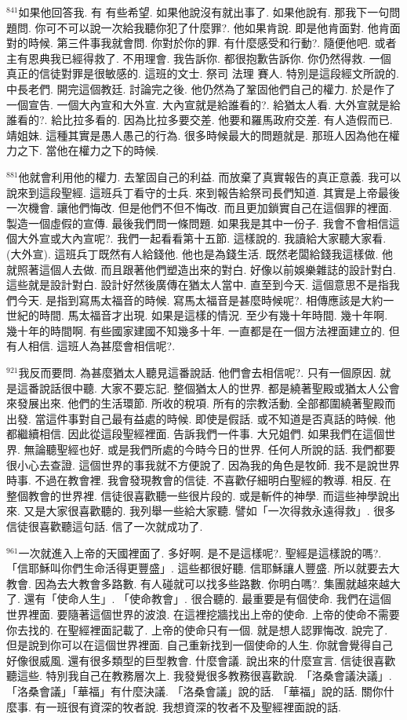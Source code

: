 \documentclass{book}
\begin{document}
$^{841}$如果他回答我.
有 有些希望.
如果他說沒有就出事了.
如果他說有.
那我下一句問題問.
你可不可以說一次給我聽你犯了什麼罪?.
他如果肯說.
即是他肯面對.
他肯面對的時候.
第三件事我就會問.
你對於你的罪.
有什麼感受和行動?.
隨便他吧.
或者主有恩典我已經得救了.
不用理會.
我告訴你.
都很抱歉告訴你.
你仍然得救.
一個真正的信徒對罪是很敏感的.
這班的文士.
祭司 法理 賽人.
特別是這段經文所說的.
中長老們.
開完這個教廷.
討論完之後.
他仍然為了鞏固他們自己的權力.
於是作了一個宣告.
一個大內宣和大外宣.
大內宣就是給誰看的?.
給猶太人看.
大外宣就是給誰看的?.
給比拉多看的.
因為比拉多要交差.
他要和羅馬政府交差.
有人造假而已.
靖姐妹.
這種其實是愚人愚己的行為.
很多時候最大的問題就是.
那班人因為他在權力之下.
當他在權力之下的時候.

$^{881}$他就會利用他的權力.
去鞏固自己的利益.
而放棄了真實報告的真正意義.
我可以說來到這段聖經.
這班兵丁看守的士兵.
來到報告給祭司長們知道.
其實是上帝最後一次機會.
讓他們悔改.
但是他們不但不悔改.
而且更加鎖實自己在這個罪的裡面.
製造一個虛假的宣傳.
最後我們問一條問題.
如果我是其中一份子.
我會不會相信這個大外宣或大內宣呢?.
我們一起看看第十五節.
這樣說的.
我讀給大家聽大家看.
(大外宣).
這班兵丁既然有人給錢他.
他也是為錢生活.
既然老闆給錢我這樣做.
他就照著這個人去做.
而且跟著他們塑造出來的對白.
好像以前娛樂雜誌的設計對白.
這些就是設計對白.
設計好然後廣傳在猶太人當中.
直至到今天.
這個意思不是指我們今天.
是指到寫馬太福音的時候.
寫馬太福音是甚麼時候呢?.
相傳應該是大約一世紀的時間.
馬太福音才出現.
如果是這樣的情況.
至少有幾十年時間.
幾十年啊.
幾十年的時間啊.
有些國家建國不知幾多十年.
一直都是在一個方法裡面建立的.
但有人相信.
這班人為甚麼會相信呢?.

$^{921}$我反而要問.
為甚麼猶太人聽見這番說話.
他們會去相信呢?.
只有一個原因.
就是這番說話很中聽.
大家不要忘記.
整個猶太人的世界.
都是繞著聖殿或猶太人公會來發展出來.
他們的生活環節.
所收的稅項.
所有的宗教活動.
全部都圍繞著聖殿而出發.
當這件事對自己最有益處的時候.
即使是假話.
或不知道是否真話的時候.
他都繼續相信.
因此從這段聖經裡面.
告訴我們一件事.
大兄姐們.
如果我們在這個世界.
無論聽聖經也好.
或是我們所處的今時今日的世界.
任何人所說的話.
我們都要很小心去查證.
這個世界的事我就不方便說了.
因為我的角色是牧師.
我不是說世界時事.
不過在教會裡.
我會發現教會的信徒.
不喜歡仔細明白聖經的教導.
相反.
在整個教會的世界裡.
信徒很喜歡聽一些很片段的.
或是斬件的神學.
而這些神學說出來.
又是大家很喜歡聽的.
我列舉一些給大家聽.
譬如「一次得救永遠得救」.
很多信徒很喜歡聽這句話.
信了一次就成功了.

$^{961}$一次就進入上帝的天國裡面了.
多好啊.
是不是這樣呢?.
聖經是這樣說的嗎?.
「信耶穌叫你們生命活得更豐盛」.
這些都很好聽.
信耶穌讓人豐盛.
所以就要去大教會.
因為去大教會多路數.
有人碰就可以找多些路數.
你明白嗎?.
集團就越來越大了.
還有「使命人生」.
「使命教會」.
很合聽的.
最重要是有個使命.
我們在這個世界裡面.
要隨著這個世界的波浪.
在這裡挖牆找出上帝的使命.
上帝的使命不需要你去找的.
在聖經裡面記載了.
上帝的使命只有一個.
就是想人認罪悔改.
說完了.
但是說到你可以在這個世界裡面.
自己重新找到一個使命的人生.
你就會覺得自己好像很威風.
還有很多類型的巨型教會.
什麼會議.
說出來的什麼宣言.
信徒很喜歡聽這些.
特別我自己在教務層次上.
我發覺很多教務很喜歡說.
「洛桑會議決議」.
「洛桑會議」「華福」有什麼決議.
「洛桑會議」說的話.
「華福」說的話.
關你什麼事.
有一班很有資深的牧者說.
我想資深的牧者不及聖經裡面說的話.
\end{document}
